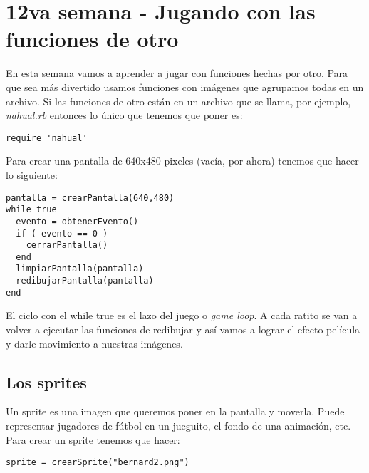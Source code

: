 \chapter{12va semana - Jugando con las funciones de otro}


	
En esta semana vamos a aprender a jugar con funciones hechas por otro. Para que sea más divertido usamos funciones con imágenes que agrupamos todas en un archivo. Si las funciones de otro están en un archivo que se llama, por ejemplo, \emph{nahual.rb} entonces lo único que tenemos que poner es:
\begin{lstlisting}
require 'nahual'
\end{lstlisting}

Para crear una pantalla de 640x480 pixeles (vacía, por ahora) tenemos que hacer lo siguiente:
\begin{lstlisting}
pantalla = crearPantalla(640,480)
while true 
  evento = obtenerEvento()
  if ( evento == 0 )
    cerrarPantalla()
  end 
  limpiarPantalla(pantalla)
  redibujarPantalla(pantalla)
end
\end{lstlisting}

El ciclo con el while true es el lazo del juego o \emph{game loop}. A cada ratito se van a volver a ejecutar las funciones de redibujar y así vamos a lograr el efecto película y darle movimiento a nuestras imágenes.

\section{Los sprites}
Un sprite es una imagen que queremos poner en la pantalla y moverla. Puede representar jugadores de fútbol en un jueguito, el fondo de una animación, etc. Para crear un sprite tenemos que hacer:
\begin{lstlisting}
sprite = crearSprite("bernard2.png")
\end{lstlisting}

